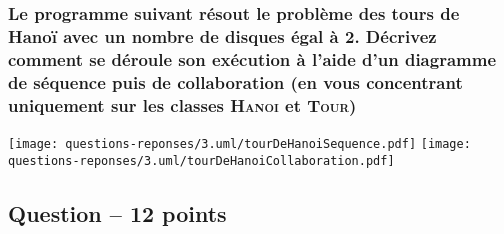 \subsubsection{Le programme suivant résout le problème des tours de Hanoï avec un nombre de disques égal à 2. Décrivez comment se déroule son exécution à l'aide d'un diagramme de séquence puis de collaboration (en vous concentrant uniquement sur les classes \textsc{Hanoi} et \textsc{Tour})}

\begin{center}
    \color[rgb]{0,0.48,0.58}
    \texttt{[image: questions-reponses/3.uml/tourDeHanoiSequence.pdf]}
    \texttt{[image: questions-reponses/3.uml/tourDeHanoiCollaboration.pdf]}
\end{center}



\subsection{Question – 12 points}



